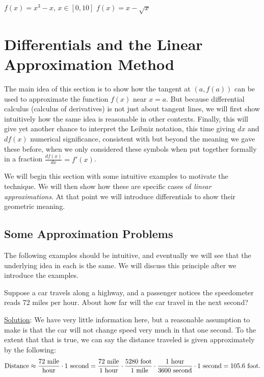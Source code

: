 \bex $f(x)=x^3-x$, $x\in[0,10]$
\eex
\bex $f(x)=x-\sqrt{x}$
\eex





  




\section{Differentials and the Linear Approximation Method
\label{Differentials/LinearApproxs}}
The main idea of this section is to show how the tangent at $(a,f(a))$ can
be used to approximate the function $f(x)$ near $x=a$.
But because differential calculus (calculus of derivatives) is not
just about tangent lines, we will first show intuitively how
the same idea is reasonable in other contexts.  Finally, this
will give yet another chance to interpret the Leibniz notation,
this time giving $dx$ and $df(x)$ numerical significance, 
consistent with but beyond the meaning we gave these
before, when we only considered these symbols when put together
formally in a fraction $\frac{df(x)}{dx}=f'(x)$.




We will begin this section with some intuitive examples to
motivate the technique.  We will then show how these 
are specific cases of {\it linear approximations}.  
At that point we will introduce differentials to show their
geometric meaning.

\subsection{Some Approximation Problems}
The following examples should be intuitive, and eventually we will see that
the underlying idea in each is the same.  We will discuss this principle
after we introduce the examples.

\bex Suppose a car travels along a highway, and a passenger
notices the speedometer reads 72 miles per hour.  
About how far will the car travel in the next second?

\underline{Solution}: We have very little information here,
but a reasonable assumption to make is that the car will
not change speed very much in that one second.
To the extent that that is true, we can say
the distance traveled is given approximately by the following:
$$\text{Distance}
\approx \frac{72\text{ \rm mile}}{\text{\rm hour}}
  \cdot 1\text{ \rm second}%
= \frac{\text{\rm 72 mile}}{\text{\rm 1 hour}}\cdot\frac{\text{\rm 5280 foot}}
{\text{ \rm 1  mile}}
   \cdot\frac{\text{\rm 1 hour}}{\text{\rm 3600 second}} 
   \cdot 1\text{ \rm second}%
\vphantom{\frac88}
=105.6\text{ \rm foot}.
$$

